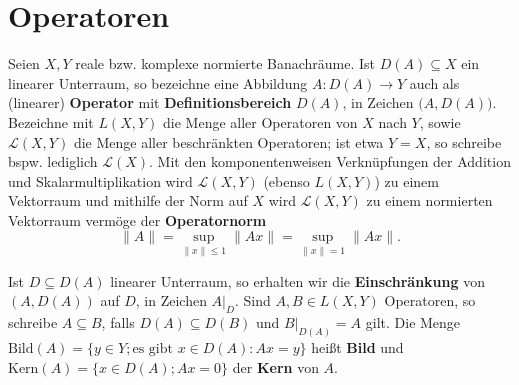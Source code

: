 

\section{Operatoren}

\begin{defi}[Operator]
\par
Seien $X, Y$ reale bzw. komplexe normierte Banachräume. Ist $D(A)\subseteq X$ ein linearer Unterraum, so bezeichne eine Abbildung $A\colon D(A)\to Y$ auch als (linearer) \textbf{Operator} mit \textbf{Definitionsbereich} $D(A)$, in Zeichen $\big(A, D(A)\big)$. Bezeichne mit $L(X, Y)$ die Menge aller Operatoren von $X$ nach $Y$, sowie $\mathcal L(X,Y)$ die Menge aller beschränkten Operatoren; ist etwa $Y=X$, so schreibe bspw. lediglich $\mathcal L(X)$. Mit den komponentenweisen Verknüpfungen der Addition und Skalarmultiplikation wird $\mathcal L(X,Y)$ (ebenso $L(X,Y)$) zu einem Vektorraum und mithilfe der Norm auf $X$ wird $\mathcal L(X,Y)$ zu einem normierten Vektorraum vermöge der \textbf{Operatornorm}
\begin{equation}\label{eq:}
\|A\|=\sup_{\|x\|\leq 1}\|Ax\| = \sup_{\|x\|=1}\|Ax\|.
\end{equation}

\par 
Ist $D\subseteq D(A)$ linearer Unterraum, so erhalten wir die \textbf{Einschränkung} von $(A,D(A))$ auf $D$, in Zeichen $A|_D$. Sind $A,B\in L(X,Y)$ Operatoren, so schreibe $A\subseteq B$, falls $D(A)\subseteq D(B)$ und $B|_{D(A)}=A$ gilt. Die Menge $\text{Bild}(A) = \{y\in Y; \text{es gibt } x\in D(A): Ax = y\}$ heißt  \textbf{Bild} und $\text{Kern}(A)=\{x\in D(A); Ax=0\}$ der \textbf{Kern} von $A$.

\par
\end{defi}

